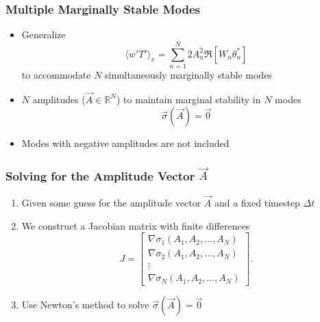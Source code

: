 \begin{frame}[fragile]
    \frametitle{Multiple Marginally Stable Modes}
    \begin{itemize}
        \item Generalize
        \begin{equation}
            \langle w' T' \rangle_x = \sum_{n = 1}^{N} 2 A_n^2  \Re\left[ W_n \theta_n^* \right] 
        \end{equation}
        to accommodate $N$ simultaneously marginally stable modes\newline
        
        \item $N$ amplitudes ($\vec{A}\in\mathbb{R}^N$) to maintain marginal stability in $N$ modes
        \begin{equation}
            \vec{\sigma}(\vec{A}) = \vec{0}
        \end{equation} 
        \item Modes with negative amplitudes are not included
    \end{itemize}
    
\end{frame}

\begin{frame}[fragile]
    \frametitle{Solving for the Amplitude Vector $\vec{A}$}
    \begin{enumerate}
        \item Given some guess for the amplitude vector $\vec{A}$ and a fixed timestep $\Delta t$\newline
        
        \item We construct a Jacobian matrix with finite differences
        \begin{equation}
            J = \begin{bmatrix}
                \nabla \sigma_1 (A_1, A_2, ..., A_N) \\
                \nabla \sigma_2 (A_1, A_2, ..., A_N) \\
                \vdots \\
                \nabla \sigma_N (A_1, A_2, ..., A_N) 
            \end{bmatrix}.
        \end{equation}\newline

        \item Use Newton's method to solve $\vec{\sigma}(\vec{A}) = \vec{0}$
    \end{enumerate}
    
\end{frame}

